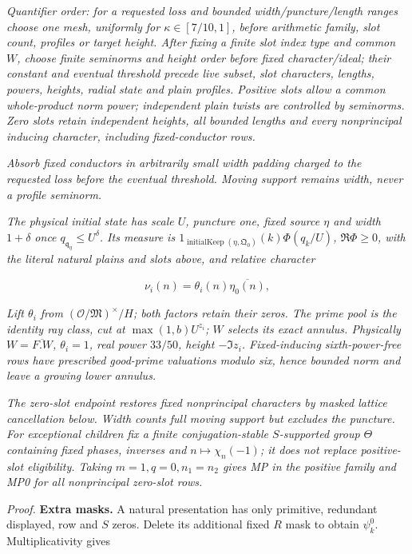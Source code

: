 \emph{Quantifier order: for a requested loss and bounded width/puncture/length ranges choose one mesh, uniformly for \(\kappa\in[7/10,1]\), before arithmetic family, slot count, profiles or target height. After fixing a finite slot index type and common \(W\), choose finite seminorms and height order before fixed character/ideal; their constant and eventual threshold precede live subset, slot characters, lengths, powers, heights, radial state and plain profiles. Positive slots allow a common whole-product norm power; independent plain twists are controlled by seminorms. Zero slots retain independent heights, all bounded lengths and every nonprincipal inducing character, including fixed-conductor rows.}

\emph{Absorb fixed conductors in arbitrarily small width padding charged to the requested loss before the eventual threshold. Moving support remains width, never a profile seminorm.}

\emph{The physical initial state has scale \(U\), puncture one, fixed source \(\eta\) and width \(1+\delta\) once \(q_{\mathfrak q_\eta}\le U^\delta\). Its measure is \(1_{\operatorname{initialKeep}(\eta,\mathfrak Q_0)}(k)\Phi(q_k/U)\), \(\Re\Phi\ge0\), with the literal natural plains and slots above, and relative character}

\[
\nu_i(n)=\theta_i(n)\overline{\eta_0(n)},
\]

\emph{Lift \(\theta_i\) from \((\mathcal O/\mathfrak M)^\times/H\); both factors retain their zeros. The prime pool is the identity ray class, cut at \(\max(1,b)U^{z_i}\); \(W\) selects its exact annulus. Physically \(W=\overline{F.W}\), \(\theta_i=1\), real power \(33/50\), height \(-\Im z_i\). Fixed-inducing sixth-power-free rows have prescribed good-prime valuations modulo six, hence bounded norm and leave a growing lower annulus.}

\emph{The zero-slot endpoint restores fixed nonprincipal characters by masked lattice cancellation below. Width counts full moving support but excludes the puncture. For exceptional children fix a finite conjugation-stable \(S\)-supported group \(\Theta\) containing fixed phases, inverses and \(n\mapsto\chi_n(-1)\); it does not replace positive-slot eligibility. Taking \(m=1,q=0,n_1=n_2\) gives MP in the positive family and MP0 for all nonprincipal zero-slot rows.}

\emph{Proof.} \textbf{Extra masks.} A natural presentation has only primitive, redundant displayed, row and \(S\) zeros. Delete its additional fixed \(R\) mask to obtain \(\psi_k^0\). Multiplicativity gives

